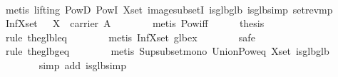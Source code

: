 \begin{isabellebody}
\ \ \ \ \ \ \isamarkupfalse%
\ {}metis\ {}lifting{}\ PowD\ PowI\ X{}set\ image{}subsetI\ is{}glb{}glb\ is{}glb{}simp\ set{}rev{}mp{}\isanewline
\ \ \ \ \isamarkupfalse%
\ Inf{}X{}set{}\ {}{}\ {}\ X\ {}\ carrier\ A{}\isanewline
\ \ \ \ \ \ \isamarkupfalse%
\ {}metis\ Pow{}iff{}\isanewline
\isanewline
\ \ \ \ \isamarkupfalse%
\ {}thesis\isanewline
\ \ \ \ \ \ \isamarkupfalse%
\ {}rule\ the{}glb{}leq{}\isanewline
\ \ \ \ \ \ \isamarkupfalse%
\ {}metis\ Inf{}X{}set\ glb{}ex{}\isanewline
\ \ \ \ \ \ \isamarkupfalse%
\ safe\isanewline
\ \ \ \ \ \ \isamarkupfalse%
\ {}rule\ the{}glb{}geq{}\isanewline
\ \ \ \ \ \ \isamarkupfalse%
\ {}metis\ Sup{}subset{}mono\ Union{}Pow{}eq\ X{}set\ is{}glb{}glb{}\isanewline
\ \ \ \ \ \ \isamarkupfalse%
\ {}simp\ add{}\ is{}glb{}simp{}\isanewline

\end{isabellebody}
